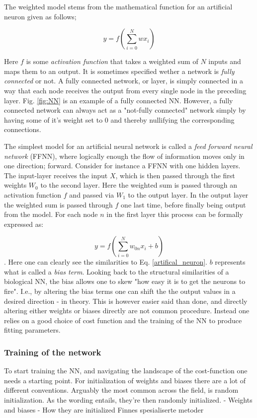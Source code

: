 The weighted model stems from the mathematical function for an artificial neuron given as follows; 

\begin{equation}\label{artifical_neuron}
    y = f\left( \sum_{i=0}^Nwx_i \right) 
\end{equation}

Here $f$ is some \textit{activation function} that takes a weighted sum of $N$ inputs and maps them to an output. 
It is sometimes specified wether a network is \textit{fully connected} or not. A fully connected network, or layer, is simply connected in a way that each node receives the output from every single node in the preceding layer. Fig. \ref{fig:NN} is an example of a fully connected NN. However, a fully connected network can always act as a "not-fully connected" network simply by having some of it's weight set to $0$ and thereby nullifying the corresponding connections. 

The simplest model for an artificial neural network is called a \textit{feed forward neural network} (FFNN), where logically enough the flow of information moves only in one direction; forward. Consider for instance a FFNN with one hidden layers. The input-layer receives the input $X$, which is then passed through the first weights $W_0$ to the second layer. Here the weighted sum is passed through an activation function $f$ and passed via $W_1$ to the output layer. In the output layer the weighted sum is passed through $f$ one last time, before finally being output from the model. For each node $n$ in the first layer this process can be formally expressed as:


\begin{equation}
    y = f\left( \sum_{i=0}^N w_{0n}x_i + b\right)
\end{equation}
\citep[p.17]{Ketkar2017}. Here one can clearly see the similarities to Eq. \ref{artifical_neuron}. $b$ represents what is called a \textit{bias term}. Looking back to the structural similarities of a biological NN, the bias allows one to skew "how easy it is to get the neurons to fire". I.e., by altering the bias terms one can shift the the output values in a desired direction - in theory. This is however easier said than done, and directly altering either weights or biases directly are not common procedure. Instead one relies on a good choice of cost function and the training of the NN to produce fitting parameters. 

\subsubsection{Training of the network}
To start training the NN, and navigating the landscape of the cost-function one needs a starting point. For initialization of weights and biases there are a lot of different conventions. Arguably the most common across the field, is random initialization. As the wording entails, they're then randomly initialized. 
- Weights and biases
    - How they are initialized
Finnes spesialiserte metoder 

